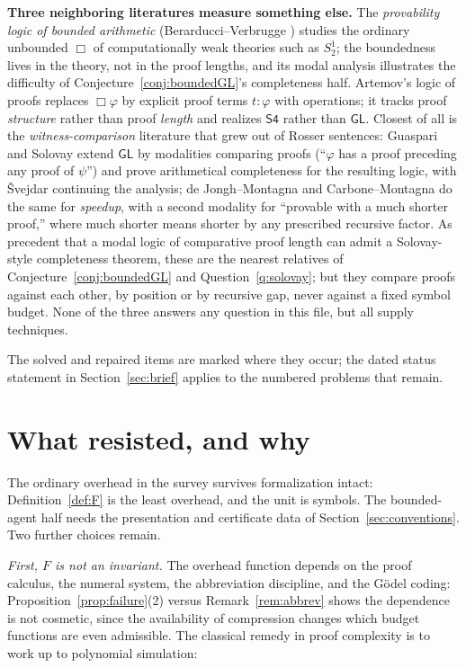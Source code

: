 \documentclass[11pt]{amsart}
\theoremstyle{plain}
\theoremstyle{definition}
\newcommand{\GL}{\mathsf{GL}}
\begin{document}
\textbf{Three neighboring literatures measure something else.} The \emph{provability logic of bounded arithmetic} (Berarducci--Verbrugge \cite{berarducci1993}) studies the ordinary unbounded $\Box$ of computationally weak theories such as $S^1_2$; the boundedness lives in the theory, not in the proof lengths, and its modal analysis illustrates the difficulty of Conjecture~\ref{conj:boundedGL}'s completeness half. Artemov's logic of proofs \cite{artemov2001} replaces $\Box\varphi$ by explicit proof terms $t{:}\varphi$ with operations; it tracks proof \emph{structure} rather than proof \emph{length} and realizes $\mathsf{S4}$ rather than $\GL$. Closest of all is the \emph{witness-comparison} literature that grew out of Rosser sentences: Guaspari and Solovay \cite{guaspari1979} extend $\GL$ by modalities comparing proofs (``$\varphi$ has a proof preceding any proof of $\psi$'') and prove arithmetical completeness for the resulting logic, with \v{S}vejdar \cite{svejdar1983} continuing the analysis; de Jongh--Montagna \cite{dejongh1989} and Carbone--Montagna \cite{carbone1990} do the same for \emph{speedup}, with a second modality for ``provable with a much shorter proof,'' where much shorter means shorter by any prescribed recursive factor. As precedent that a modal logic of comparative proof length can admit a Solovay-style completeness theorem, these are the nearest relatives of Conjecture~\ref{conj:boundedGL} and Question~\ref{q:solovay}; but they compare proofs against each other, by position or by recursive gap, never against a fixed symbol budget. None of the three answers any question in this file, but all supply techniques.

The solved and repaired items are marked where they occur; the dated status statement in Section~\ref{sec:brief} applies to the numbered problems that remain.

\section{What resisted, and why}
\label{sec:resisted}

The ordinary overhead in the survey survives formalization intact: Definition~\ref{def:F} is the least overhead, and the unit is symbols. The bounded-agent half needs the presentation and certificate data of Section~\ref{sec:conventions}. Two further choices remain.

\emph{First, $F$ is not an invariant.} The overhead function depends on the proof calculus, the numeral system, the abbreviation discipline, and the G\"odel coding: Proposition~\ref{prop:failure}(2) versus Remark~\ref{rem:abbrev} shows the dependence is not cosmetic, since the availability of compression changes which budget functions are even admissible. The classical remedy in proof complexity is to work up to polynomial simulation:
\end{document}
